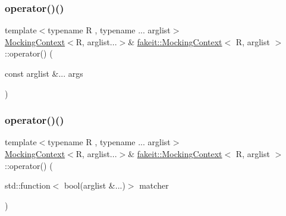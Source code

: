 \mbox{\label{classfakeit_1_1MockingContext_a70a55886680449fa36e8f5869af93389}} 
\subsubsection{\texorpdfstring{operator()()}{operator()()}\hspace{0.1cm}{\footnotesize\ttfamily [6/18]}}
{\footnotesize\ttfamily template$<$typename R , typename ... arglist$>$ \\
\mbox{\hyperlink{classfakeit_1_1MockingContext}{Mocking\+Context}}$<$R, arglist...$>$\& \mbox{\hyperlink{classfakeit_1_1MockingContext}{fakeit\+::\+Mocking\+Context}}$<$ R, arglist $>$\+::operator() (\begin{DoxyParamCaption}\item[{const arglist \&...}]{args }\end{DoxyParamCaption})\hspace{0.3cm}{\ttfamily [inline]}}

\mbox{\label{classfakeit_1_1MockingContext_aff3a6b6107f5bc4e028e75bf9b55f313}} 
\subsubsection{\texorpdfstring{operator()()}{operator()()}\hspace{0.1cm}{\footnotesize\ttfamily [7/18]}}
{\footnotesize\ttfamily template$<$typename R , typename ... arglist$>$ \\
\mbox{\hyperlink{classfakeit_1_1MockingContext}{Mocking\+Context}}$<$R, arglist...$>$\& \mbox{\hyperlink{classfakeit_1_1MockingContext}{fakeit\+::\+Mocking\+Context}}$<$ R, arglist $>$\+::operator() (\begin{DoxyParamCaption}\item[{std\+::function$<$ bool(arglist \&...)$>$}]{matcher }\end{DoxyParamCaption})\hspace{0.3cm}{\ttfamily [inline]}}

